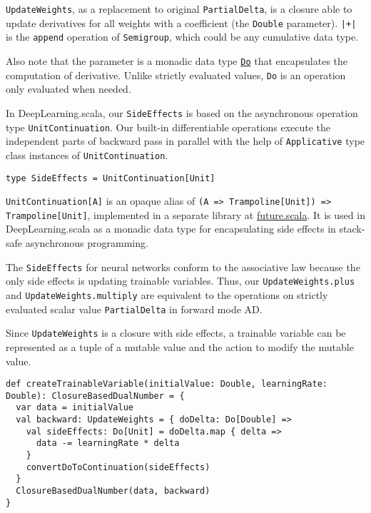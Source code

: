 \lstinline{UpdateWeights}, as a replacement to original \lstinline{PartialDelta}, is a closure able to update derivatives for all weights with a coefficient (the \lstinline{Double} parameter).
\lstinline{|+|} is the \lstinline{append} operation of \lstinline{Semigroup}, which could be any cumulative data type.

Also note that the parameter is a monadic data type \href{https://javadoc.io/page/com.thoughtworks.raii/asynchronous_2.11/latest/com/thoughtworks/raii/asynchronous%24%24Do.html}{\lstinline{Do}} that encapsulates the computation of derivative. Unlike strictly evaluated values, \lstinline{Do} is an operation only evaluated when needed.

In DeepLearning.scala, our \lstinline{SideEffects} is based on the asynchronous operation type \texttt{UnitContinuation}. Our built-in differentiable operations execute the independent parts of backward pass in parallel with the help of \lstinline{Applicative} type class instances of \texttt{UnitContinuation}.

\begin{lstlisting}[float={h t b p},caption={Monadic side-effects}, label={SideEffects}]
type SideEffects = UnitContinuation[Unit]
\end{lstlisting}

\lstinline{UnitContinuation[A]} is an opaque alias \cite{erik2017opaque} of \lstinline{(A => Trampoline[Unit]) => Trampoline[Unit]}, implemented in a separate library at \href{https://github.com/ThoughtWorksInc/future.scala}{future.scala}. It is used in DeepLearning.scala as a monadic data type for encapsulating side effects in stack-safe asynchronous programming.

The \lstinline{SideEffects} for neural networks conform to the associative law because the only side effects is updating \glspl{trainable variable}. Thus, our \lstinline{UpdateWeights.plus} and \lstinline{UpdateWeights.multiply} are equivalent to the operations on strictly evaluated scalar value \lstinline{PartialDelta} in forward mode AD.

Since \lstinline{UpdateWeights} is a closure with side effects, a \gls{trainable variable} can be represented as a tuple of a mutable value and the action to modify the mutable value.

\begin{lstlisting}[float={h t b p},caption={Create a dual number for a \gls{trainable variable}}, label={createTrainableVariable}]
def createTrainableVariable(initialValue: Double, learningRate: Double): ClosureBasedDualNumber = {
  var data = initialValue
  val backward: UpdateWeights = { doDelta: Do[Double] =>
    val sideEffects: Do[Unit] = doDelta.map { delta =>
      data -= learningRate * delta
    }
    convertDoToContinuation(sideEffects)
  }
  ClosureBasedDualNumber(data, backward)
}
\end{lstlisting}

